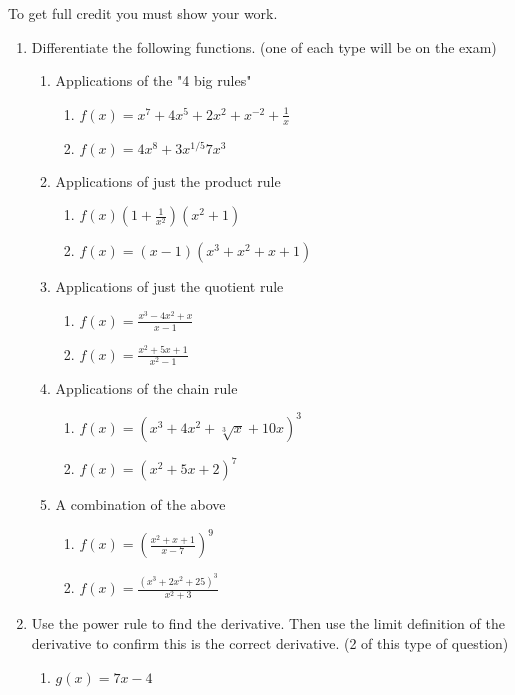 \documentclass[12pt]{article}
\begin{document}
To get full credit you must show your work. 
\begin{enumerate}
    \item Differentiate the following functions. (one of each type will be on the exam)
    \begin{enumerate}
        \item Applications of the "4 big rules"
        \begin{enumerate}
        \item $f(x)=x^7+4x^5+2x^2+x^{-2}+\frac{1}{x}$
        \item $f(x)=4x^8+3x^{1/5}7x^3$
		\end{enumerate}         
        \item Applications of just the product rule
        \begin{enumerate}
        \item $f(x)(1+\frac{1}{x^2})(x^2+1)$
        \item $f(x)=(x-1)(x^3+x^2+x+1)$
        \end{enumerate}
        \item Applications of just the quotient rule
        \begin{enumerate}
        \item $f(x)=\frac{x^3-4x^2+x}{x-1}$
        \item $f(x)=\frac{x^2+5x+1}{x^2-1}$
        \end{enumerate}
        \item Applications of the chain rule
        \begin{enumerate}
        \item $f(x)=(x^3+4x^2+\sqrt[3]{x}+10x)^3$
        \item $f(x)=(x^2+5x+2)^7$
        \end{enumerate}
        \item A combination of the above
        \begin{enumerate}
        \item $f(x)=\left(\frac{x^2+x+1}{x-7}\right)^9$
        \item $f(x)=\frac{(x^3+2x^2+25)^3}{x^2+3}$
        \end{enumerate}
    \end{enumerate}
    \item Use the power rule to find the derivative. Then use the limit definition of the derivative to confirm this is the correct derivative. (2 of this type of question) 
    \begin{enumerate}
        \item $g(x)=7x-4$

\end{enumerate}
\end{enumerate}
\end{document}
